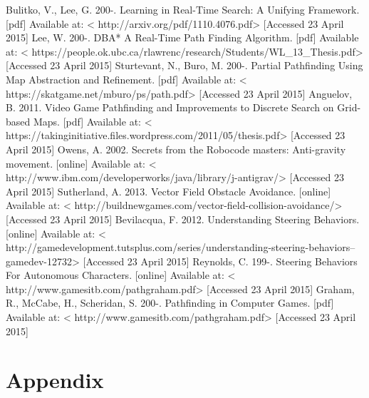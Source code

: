 \documentclass[a4paper]{report}
\begin{document}

Bulitko, V., Lee, G. 200-. Learning in Real-Time Search: A Unifying Framework. [pdf] Available at: < http://arxiv.org/pdf/1110.4076.pdf> [Accessed 23 April 2015]
\newline
\newline
Lee, W. 200-. DBA* A Real-Time Path Finding Algorithm. [pdf] Available at: < https://people.ok.ubc.ca/rlawrenc/research/Students/WL_13_Thesis.pdf> [Accessed 23 April 2015]
\newline
\newline
Sturtevant, N., Buro, M. 200-. Partial Pathfinding Using Map Abstraction and Refinement. [pdf] Available at: < https://skatgame.net/mburo/ps/path.pdf> [Accessed 23 April 2015]
\newline
\newline
Anguelov, B. 2011. Video Game Pathfinding and Improvements to Discrete Search on Grid-based Maps. [pdf] Available at: < https://takinginitiative.files.wordpress.com/2011/05/thesis.pdf> [Accessed 23 April 2015]
\newline
\newline
Owens, A. 2002. Secrets from the Robocode masters: Anti-gravity movement. [online] Available at: < http://www.ibm.com/developerworks/java/library/j-antigrav/> [Accessed 23 April 2015]
\newline
\newline
Sutherland, A. 2013. Vector Field Obstacle Avoidance. [online] Available at: < http://buildnewgames.com/vector-field-collision-avoidance/> [Accessed 23 April 2015]
\newline
\newline
Bevilacqua, F. 2012. Understanding Steering Behaviors. [online] Available at: < http://gamedevelopment.tutsplus.com/series/understanding-steering-behaviors--gamedev-12732> [Accessed 23 April 2015]
\newline
\newline
Reynolds, C. 199-. Steering Behaviors For Autonomous Characters. [online] Available at: < http://www.gamesitb.com/pathgraham.pdf> [Accessed 23 April 2015]
\newline
\newline
Graham, R., McCabe, H., Scheridan, S. 200-. Pathfinding in Computer Games. [pdf] Available at: < http://www.gamesitb.com/pathgraham.pdf> [Accessed 23 April 2015]


\appendix
\chapter{Appendix}
\end{document}
